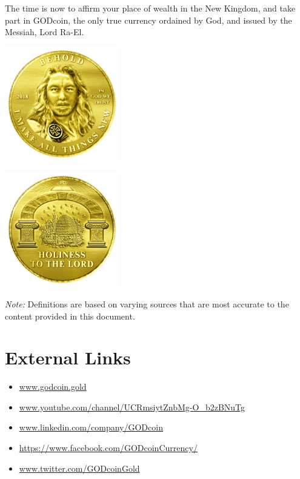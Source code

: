 \documentclass[12pt,a4paper]{article}
\begin{document}
  The time is now to affirm your place of wealth in the New Kingdom, and take
  part in GODcoin, the only true currency ordained by God, and issued by the
  Messiah, Lord Ra-El.\\

  \begin{minipage}{.5\textwidth}
    \centering
    \includegraphics[width=50mm]{coin-front.png}\\
  \end{minipage}%
  \begin{minipage}{.5\textwidth}
    \centering
    \includegraphics[width=50mm]{coin-back.png}\\
  \end{minipage}

  \textit{Note:} Definitions are based on varying sources that are most accurate
  to the content provided in this document.
  \newpage

  \section*{External Links}
  \begin{itemize}
    \item{\url{www.godcoin.gold}}
    \item{\url{www.youtube.com/channel/UCRmsiytZnbMg-O_b2zBNuTg}}
    \item{\url{www.linkedin.com/company/GODcoin}}
    \item{\url{https://www.facebook.com/GODcoinCurrency/}}
    \item{\url{www.twitter.com/GODcoinGold}}
  \end{itemize}
\end{document}
